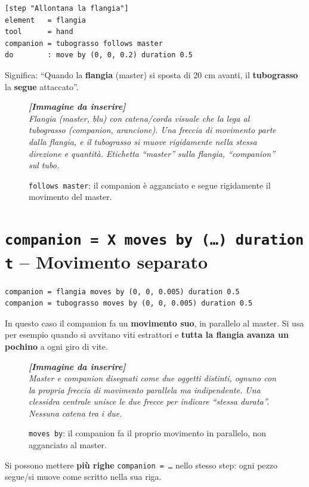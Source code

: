 ﻿\documentclass[a4paper,12pt,oneside]{book}
\newcommand{\kw}[1]{\texttt{\color{keycolor}#1}}
\newcommand{\val}[1]{\texttt{\color{cvtgreen}#1}}
\newcommand{\imgph}[2]{%
  \begin{tcolorbox}[colback=cvtlightblue!30,colframe=cvtblue!40,%
    width=#1,halign=center,valign=center,height=5cm,boxrule=0.5pt,arc=3pt]%
    \textcolor{cvtgray}{\itshape\footnotesize\textbf{[Immagine da inserire]}\\[3pt]#2}%
  \end{tcolorbox}}
\begin{document}
\begin{lstlisting}
[step "Allontana la flangia"]
element   = flangia
tool      = hand
companion = tubograsso follows master
do        : move by (0, 0, 0.2) duration 0.5
\end{lstlisting}

Significa: ``Quando la \textbf{flangia} (master) si sposta di 20 cm avanti, il
\textbf{tubograsso} la \textbf{segue} attaccato''.

\begin{figure}[H]
  \centering
  \imgph{11cm}{Flangia (master, blu) con catena/corda visuale che la lega al tubograsso (companion, arancione). Una freccia di movimento parte dalla flangia, e il tubograsso si muove rigidamente nella stessa direzione e quantità. Etichetta ``master'' sulla flangia, ``companion'' sul tubo.}
  \caption{\val{follows master}: il companion è agganciato e segue rigidamente il movimento del master.}
  \label{fig:follows-master}
\end{figure}

\section{\texttt{companion = X moves by (\ldots) duration t} -- Movimento separato}

\begin{lstlisting}
companion = flangia moves by (0, 0, 0.005) duration 0.5
companion = tubograsso moves by (0, 0, 0.005) duration 0.5
\end{lstlisting}

In questo caso il companion fa un \textbf{movimento suo}, in parallelo al
master. Si usa per esempio quando si avvitano viti estrattori e \textbf{tutta
la flangia avanza un pochino} a ogni giro di vite.

\begin{figure}[H]
  \centering
  \imgph{11cm}{Master e companion disegnati come due oggetti distinti, ognuno con la propria freccia di movimento parallela ma indipendente. Una clessidra centrale unisce le due frecce per indicare ``stessa durata''. Nessuna catena tra i due.}
  \caption{\val{moves by}: il companion fa il proprio movimento in parallelo, non agganciato al master.}
  \label{fig:moves-by}
\end{figure}

\begin{notablu}
Si possono mettere \textbf{più righe} \kw{companion = \ldots} nello stesso step:
ogni pezzo segue/si muove come scritto nella sua riga.
\end{notablu}
\end{document}
